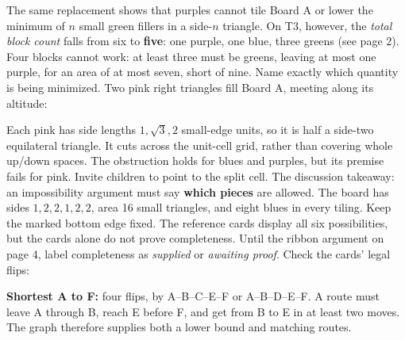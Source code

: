 \documentclass[11pt]{article}
\begin{document}
The same replacement shows that purples cannot tile Board A or lower the minimum of \(n\) small green fillers in a side-\(n\) triangle. On T3, however, the \emph{total block count} falls from six to \textbf{five}: one purple, one blue, three greens (see page 2). Four blocks cannot work: at least three must be greens, leaving at most one purple, for an area of at most seven, short of nine. Name exactly which quantity is being minimized.
Two pink right triangles fill Board A, meeting along its altitude:
\begin{center}\end{center}
Each pink has side lengths \(1,\sqrt3,2\) small-edge units, so it is half a side-two equilateral triangle. It cuts across the unit-cell grid, rather than covering whole up/down spaces. The obstruction holds for blues and purples, but its premise fails for pink. Invite children to point to the split cell. The discussion takeaway: an impossibility argument must say \textbf{which pieces} are allowed.
The board has sides \(1,2,2,1,2,2\), area 16 small triangles, and eight blues in every tiling. Keep the marked bottom edge fixed. The reference cards display all six possibilities, but the cards alone do not prove completeness. Until the ribbon argument on page 4, label completeness as \emph{supplied} or \emph{awaiting proof}. Check the cards' legal flips:
\begin{center}\end{center}
\textbf{Shortest A to F:} four flips, by A--B--C--E--F or A--B--D--E--F. A route must leave A through B, reach E before F, and get from B to E in at least two moves. The graph therefore supplies both a lower bound and matching routes.
\end{document}
